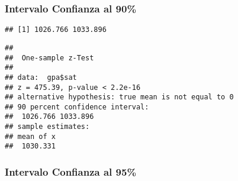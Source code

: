 \documentclass[
]{article}
\newenvironment{Shaded}{\begin{snugshade}}{\end{snugshade}}
\newcommand{\AttributeTok}[1]{\textcolor[rgb]{0.80,0.80,0.80}{#1}}
\newcommand{\CommentTok}[1]{\textcolor[rgb]{0.50,0.62,0.50}{#1}}
\newcommand{\FloatTok}[1]{\textcolor[rgb]{0.75,0.75,0.82}{#1}}
\newcommand{\FunctionTok}[1]{\textcolor[rgb]{0.94,0.94,0.56}{#1}}
\newcommand{\NormalTok}[1]{\textcolor[rgb]{0.80,0.80,0.80}{#1}}
\newcommand{\OtherTok}[1]{\textcolor[rgb]{0.94,0.94,0.56}{#1}}
\newcommand{\SpecialCharTok}[1]{\textcolor[rgb]{0.86,0.64,0.64}{#1}}
\begin{document}
\hypertarget{intervalo-confianza-al-90}{%
\subsubsection{Intervalo Confianza al
90\%}\label{intervalo-confianza-al-90}}

\begin{Shaded}
\end{Shaded}

\begin{verbatim}
## [1] 1026.766 1033.896
\end{verbatim}

\begin{Shaded}
\end{Shaded}

\begin{verbatim}
## 
##  One-sample z-Test
## 
## data:  gpa$sat
## z = 475.39, p-value < 2.2e-16
## alternative hypothesis: true mean is not equal to 0
## 90 percent confidence interval:
##  1026.766 1033.896
## sample estimates:
## mean of x 
##  1030.331
\end{verbatim}

\hypertarget{intervalo-confianza-al-95}{%
\subsubsection{Intervalo Confianza al
95\%}\label{intervalo-confianza-al-95}}

\begin{Shaded}
\end{Shaded}
\end{document}
